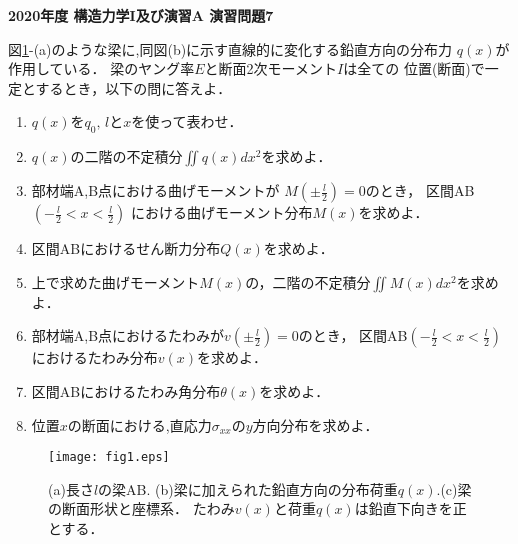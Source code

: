 \documentclass[10pt,a4j]{jarticle}
\newlength{\minitwocolumn}
\begin{document}
\newcommand{\fat}[1]{\mbox{\boldmath $#1$}}
\newcommand{\D}{\partial}
\newcommand{\w}{\omega}
\newcommand{\ga}{\alpha}
\newcommand{\gb}{\beta}
\newcommand{\gx}{\xi}
\newcommand{\gz}{\zeta}
\newcommand{\vhat}[1]{\hat{\fat{#1}}}
\newcommand{\spc}{\vspace{0.7\baselineskip}}
\newcommand{\halfspc}{\vspace{0.3\baselineskip}}

\pagestyle{empty}
\newcommand{\twofig}[2]
 {
   \begin{figure}[here]
     \begin{minipage}[t]{\minitwocolumn}
         \begin{center}   #1
         \end{center}
     \end{minipage}
         \hspace{\columnsep}
     \begin{minipage}[t]{\minitwocolumn}
         \begin{center} #2
         \end{center}
     \end{minipage}
   \end{figure}
 }
\begin{center}
	{\Large \bf 2020年度 構造力学I及び演習A 演習問題7}
\end{center}
\vspace{15mm}
図\ref{fig:fig1}-(a)のような梁に,同図(b)に示す直線的に変化する鉛直方向の分布力
$q(x)$が作用している． 梁のヤング率$E$と断面2次モーメント$I$は全ての
位置(断面)で一定とするとき，以下の問に答えよ．
\begin{enumerate}
\item
	$q(x)$を$q_0,\,l$と$x$を使って表わせ．
\item
	$q(x)$の二階の不定積分$\iint q(x)dx^2$を求めよ．
\item
	部材端A,B点における曲げモーメントが
	$M\left(\pm\frac{l}{2}\right)=0$のとき，
	区間AB$\left( -\frac{l}{2}<x < \frac{l}{2}\right)$
	における曲げモーメント分布$M(x)$を求めよ．
\item
	区間ABにおけるせん断力分布$Q(x)$を求めよ．
\item
	上で求めた曲げモーメント$M(x)$の，二階の不定積分$\iint M(x) dx^2$を求めよ．
\item
	部材端A,B点におけるたわみが$v\left(\pm\frac{l}{2}\right)=0$のとき，
	区間AB$\left( -\frac{l}{2}<x < \frac{l}{2}\right)$
	におけるたわみ分布$v(x)$を求めよ．
\item
	区間ABにおけるたわみ角分布$\theta(x)$を求めよ．
\item
	位置$x$の断面における,直応力$\sigma_{xx}$の$y$方向分布を求めよ．     
\end{enumerate}
\begin{figure}[h]
	\begin{center}
	\texttt{[image: fig1.eps]} 
	\end{center}
	\caption{(a)長さ$l$の梁AB. (b)梁に加えられた鉛直方向の分布荷重$q(x)$.(c)梁の断面形状と座標系．
        たわみ$v(x)$と荷重$q(x)$は鉛直下向きを正とする．}
	\label{fig:fig1}
\end{figure}
\end{document}

